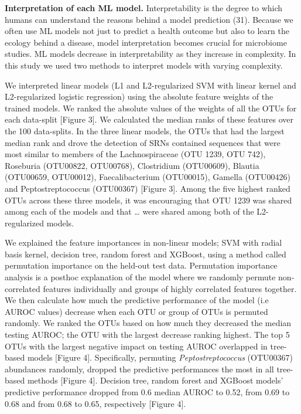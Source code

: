 \documentclass[11pt,]{article}
\begin{document}
\textbf{Interpretation of each ML model.} Interpretability is the degree
to which humans can understand the reasons behind a model prediction
(31). Because we often use ML models not just to predict a health
outcome but also to learn the ecology behind a disease, model
interpretation becomes crucial for microbiome studies. ML models
decrease in interpretability as they increase in complexity. In this
study we used two methods to interpret models with varying complexity.

We interpreted linear models (L1 and L2-regularized SVM with linear
kernel and L2-regularized logistic regression) using the absolute
feature weights of the trained models. We ranked the absolute values of
the weights of all the OTUs for each data-split {[}Figure 3{]}. We
calculated the median ranks of these features over the 100 data-splits.
In the three linear models, the OTUs that had the largest median rank
and drove the detection of SRNs contained sequences that were most
similar to members of the Lachnospiraceae (OTU 1239, OTU 742), Roseburia
(OTU00822, OTU00768), Clostridium (OTU00609), Blautia (OTU00659,
OTU00012), Faecalibacterium (OTU00015), Gamella (OTU00426) and
Peptostreptococcus (OTU00367) {[}Figure 3{]}. Among the five highest
ranked OTUs across these three models, it was encouraging that OTU 1239
was shared among each of the models and that \ldots{} were shared among
both of the L2-regularized models.

We explained the feature importances in non-linear models; SVM with
radial basis kernel, decision tree, random forest and XGBoost, using a
method called permutation importance on the held-out test data.
Permutation importance analysis is a posthoc explanation of the model
where we randomly permute non-correlated features individually and
groups of highly correlated features together. We then calculate how
much the predictive performance of the model (i.e AUROC values) decrease
when each OTU or group of OTUs is permuted randomly. We ranked the OTUs
based on how much they decreased the median testing AUROC; the OTU with
the largest decrease ranking highest. The top 5 OTUs with the largest
negative impact on testing AUROC overlapped in tree-based models
{[}Figure 4{]}. Specifically, permuting \emph{Peptostreptococcus}
(OTU00367) abundances randomly, dropped the predictive performances the
most in all tree-based methods {[}Figure 4{]}. Decision tree, random
forest and XGBoost models' predictive performance dropped from 0.6
median AUROC to 0.52, from 0.69 to 0.68 and from 0.68 to 0.65,
respectively {[}Figure 4{]}.
\end{document}

